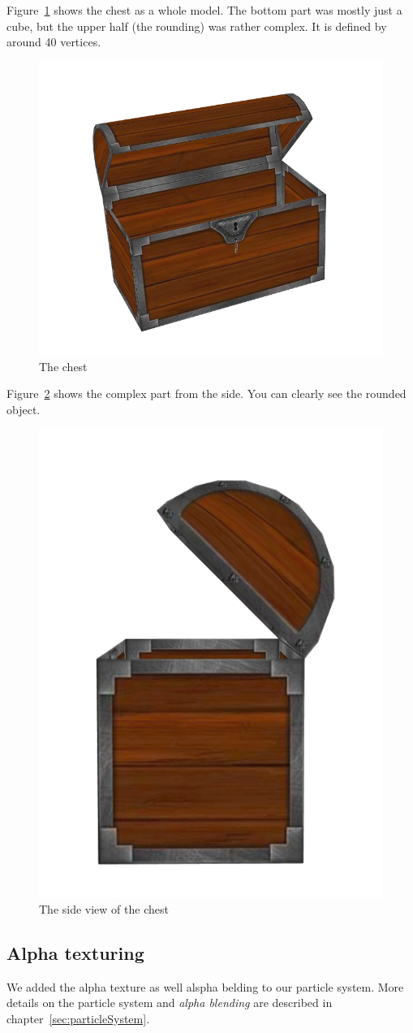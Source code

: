 Figure~\ref{fig:chest} shows the chest as a whole model.
The bottom part was mostly just a cube, but the upper half (the rounding) was rather complex.
It is defined by around 40 vertices.

\begin{figure}[h]
	\centering
	\includegraphics[width=0.5\columnwidth]{figures/chest.png}
	\caption{The chest}
	\label{fig:chest}
\end{figure}

Figure~\ref{fig:chest_side} shows the complex part from the side.
You can clearly see the rounded object.

\begin{figure}[h]
	\centering
	\includegraphics[width=0.5\columnwidth]{figures/chest_side.png}
	\caption{The side view of the chest}
	\label{fig:chest_side}
\end{figure}

\subsection{Alpha texturing} \label{subsec:alphaTexturing}
We added the alpha texture as well alspha belding to our particle system.
More details on the particle system and \emph{alpha blending} are described in chapter~\ref{sec:particleSystem}.
